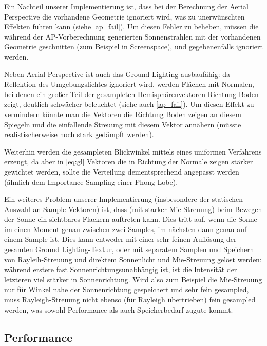 Ein Nachteil unserer Implementierung ist, dass bei der Berechnung der Aerial Perspective die vorhandene Geometrie
ignoriert wird, was zu unerwünschten Effekten führen kann (siehe \cref{ap_fail}). Um diesen Fehler zu beheben, müssen
die während der AP-Vorberechnung generierten Sonnenstrahlen mit der vorhandenen Geometrie geschnitten (zum Beispiel in
Screenspace), und gegebenenfalls ignoriert werden.

Neben Aerial Perspective ist auch das Ground Lighting ausbaufähig: da Reflektion des Umgebungslichtes ignoriert wird,
werden Flächen mit Normalen, bei denen ein großer Teil der gesampleten Hemisphärenvektoren Richtung Boden zeigt,
deutlich schwächer beleuchtet (siehe auch \cref{ap_fail}). Um diesen Effekt zu vermindern könnte man die Vektoren die
Richtung Boden zeigen an diesem Spiegeln und die einfallende Streuung mit diesem Vektor annähern (müsste
realistischerweise noch stark gedämpft werden).

Weiterhin werden die gesampleten Blickwinkel mittels eines uniformen Verfahrens erzeugt, da aber in \cref{eq:gl}
Vektoren die in Richtung der Normale zeigen stärker gewichtet werden, sollte die Verteilung dementsprechend angepasst
werden (ähnlich dem Importance Sampling einer Phong Lobe).

Ein weiteres Problem unserer Implementierung (insbesondere der statischen Auswahl an Sample-Vektoren) ist, dass (mit
starker Mie-Streuung) beim Bewegen der Sonne ein sichtbares Flackern auftreten kann. Dies tritt auf, wenn die Sonne im
einen Moment genau zwischen zwei Samples, im nächsten dann genau auf einem Sample ist. Dies kann entweder mit einer sehr
feinen Auflösung der gesamten Ground Lighting-Textur, oder mit separatem Samplen und Speichern von Rayleih-Streuung und
direktem Sonnenlicht und Mie-Streuung gelöst werden: während erstere fast Sonnenrichtungsunabhängig ist, ist die
Intensität der letzteren viel stärker in Sonnenrichtung. Wird also zum Beispiel die Mie-Streuung nur für Winkel nahe der
Sonnenrichtung gespeichert und sehr fein gesampled, muss Rayleigh-Streuung nicht ebenso (für Rayleigh übertrieben) fein
gesampled werden, was sowohl Performance als auch Speicherbedarf zugute kommt.

\subsection{Performance}

